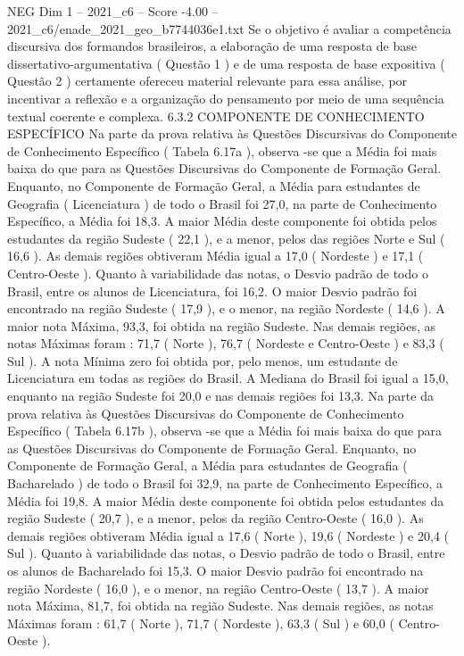 \begin{textsample}{NEG Dim 1 – 2021\_c6 – Score -4.00 – 2021\_c6/enade\_2021\_geo\_b7744036e1.txt}
Se o objetivo é avaliar a competência discursiva dos formandos brasileiros, a elaboração de uma resposta de base dissertativo-argumentativa ( Questão 1 ) e de uma resposta de base expositiva ( Questão 2 ) certamente ofereceu material relevante para essa análise, por incentivar a reflexão e a organização do pensamento por meio de uma sequência textual coerente e complexa. 6.3.2 COMPONENTE DE CONHECIMENTO ESPECÍFICO Na parte da prova relativa às Questões Discursivas do Componente de Conhecimento Específico ( Tabela 6.17a ), observa -se que a Média foi mais baixa do que para as Questões Discursivas do Componente de Formação Geral.
Enquanto, no Componente de Formação Geral, a Média para estudantes de Geografia ( Licenciatura ) de todo o Brasil foi 27,0, na parte de Conhecimento Específico, a Média foi 18,3.
A maior Média deste componente foi obtida pelos estudantes da região Sudeste ( 22,1 ), e a menor, pelos das regiões Norte e Sul ( 16,6 ).
As demais regiões obtiveram Média igual a 17,0 ( Nordeste ) e 17,1 ( Centro-Oeste ).
Quanto à variabilidade das notas, o Desvio padrão de todo o Brasil, entre os alunos de Licenciatura, foi 16,2.
O maior Desvio padrão foi encontrado na região Sudeste ( 17,9 ), e o menor, na região Nordeste ( 14,6 ).
A maior nota Máxima, 93,3, foi obtida na região Sudeste.
Nas demais regiões, as notas Máximas foram : 71,7 ( Norte ), 76,7 ( Nordeste e Centro-Oeste ) e 83,3 ( Sul ).
A nota Mínima zero foi obtida por, pelo menos, um estudante de Licenciatura em todas as regiões do Brasil.
A Mediana do Brasil foi igual a 15,0, enquanto na região Sudeste foi 20,0 e nas demais regiões foi 13,3.
Na parte da prova relativa às Questões Discursivas do Componente de Conhecimento Específico ( Tabela 6.17b ), observa -se que a Média foi mais baixa do que para as Questões Discursivas do Componente de Formação Geral.
Enquanto, no Componente de Formação Geral, a Média para estudantes de Geografia ( Bacharelado ) de todo o Brasil foi 32,9, na parte de Conhecimento Específico, a Média foi 19,8.
A maior Média deste componente foi obtida pelos estudantes da região Sudeste ( 20,7 ), e a menor, pelos da região Centro-Oeste ( 16,0 ).
As demais regiões obtiveram Média igual a 17,6 ( Norte ), 19,6 ( Nordeste ) e 20,4 ( Sul ).
Quanto à variabilidade das notas, o Desvio padrão de todo o Brasil, entre os alunos de Bacharelado foi 15,3.
O maior Desvio padrão foi encontrado na região Nordeste ( 16,0 ), e o menor, na região Centro-Oeste ( 13,7 ).
A maior nota Máxima, 81,7, foi obtida na região Sudeste.
Nas demais regiões, as notas Máximas foram : 61,7 ( Norte ), 71,7 ( Nordeste ), 63,3 ( Sul ) e 60,0 ( Centro-Oeste ).

\end{textsample}
